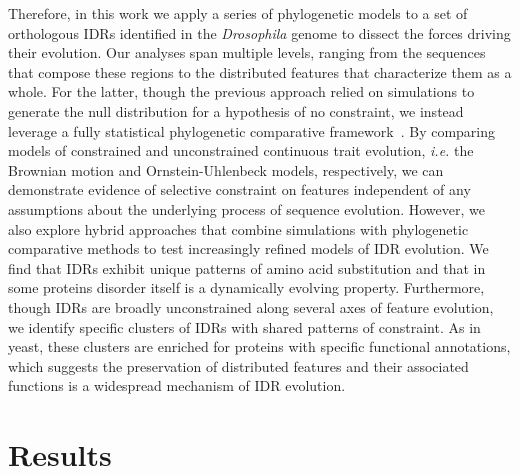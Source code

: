 Therefore, in this work we apply a series of phylogenetic models to a set of orthologous IDRs identified in the \textit{Drosophila} genome to dissect the forces driving their evolution. Our analyses span multiple levels, ranging from the sequences that compose these regions to the distributed features that characterize them as a whole. For the latter, though the previous approach relied on simulations to generate the null distribution for a hypothesis of no constraint, we instead leverage a fully statistical phylogenetic comparative framework~\cite{Cornwell2017}. By comparing models of constrained and unconstrained continuous trait evolution, \textit{i.e.} the Brownian motion and Ornstein-Uhlenbeck models, respectively, we can demonstrate evidence of selective constraint on features independent of any assumptions about the underlying process of sequence evolution. However, we also explore hybrid approaches that combine simulations with phylogenetic comparative methods to test increasingly refined models of IDR evolution. We find that IDRs exhibit unique patterns of amino acid substitution and that in some proteins disorder itself is a dynamically evolving property. Furthermore, though IDRs are broadly unconstrained along several axes of feature evolution, we identify specific clusters of IDRs with shared patterns of constraint. As in yeast, these clusters are enriched for proteins with specific functional annotations, which suggests the preservation of distributed features and their associated functions is a widespread mechanism of IDR evolution.

\section{Results}
